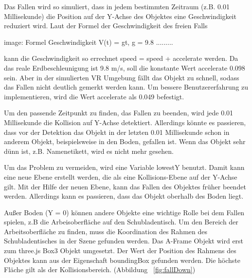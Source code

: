   Das Fallen wird so simuliert, dass in jedem bestimmten Zeitraum (z.B. 0.01 Millisekunde) die Position auf der Y-Achse des Objektes eine Geschwindigkeit reduziert wird. Laut der Formel der Geschwindigkeit des freien Falls 
  
  image: Formel Geschwindigkeit V(t) = gt, g = 9.8 .........
  
  kann die Geschwindigkeit so errechnet {\selectfont speed = speed + accelerate} werden. 
  Da das reale Erdbeschleunigung ist 9.8 m/s, soll die konstante Wert {\selectfont accelerate} 0.098 sein. Aber in der simulierten VR Umgebung fällt das Objekt zu schnell, sodass das Fallen nicht deutlich gemerkt werden kann. Um bessere Benutzererfahrung zu implementieren, wird die Wert {\selectfont accelerate} als 0.049 befestigt.
  
  Um den passende Zeitpunkt zu finden, das Fallen zu beenden, wird jede 0.01 Millisekunde die Kollision auf Y-Achse detektiert. Allerdings könnte es passieren, dass vor der Detektion das Objekt in der letzten 0.01 Millisekunde schon in anderem Objekt, beispielsweise in den Boden, gefallen ist. Wenn das Objekt sehr dünn ist, z.B. Namenetikett, wird es nicht mehr gesehen.
  
  Um das Problem zu vermeiden, wird eine Variable {\selectfont lowestY} benutzt. Damit kann eine neue Ebene erstellt werden, die als eine Kollisions-Ebene auf der Y-Achse gilt. Mit der Hilfe der neuen Ebene, kann das Fallen des Objektes früher beendet werden. Allerdings kann es passieren, dass das Objekt oberhalb des Boden liegt.
  
  Außer Boden (Y = 0) können andere Objekte eine wichtige Rolle bei dem Fallen spielen, z.B die Arbeisoberfläche auf den Schubladentisch. Um den Bereich der Arbeitsoberfläche zu finden, muss die Koordination des Rahmen des Schubladentisches in der Szene gefunden werden. Das A-Frame Objekt wird erst zum three.js Box3 Objekt umgesetzt. Der Wert der Position des Rahmens des Objektes kann aus der Eigenschaft {\selectfont boundingBox} gefunden werden. Die höchste Fläche gilt als der Kollisionsbereich. (Abbildung ~\ref{fig:fallDown})
  
